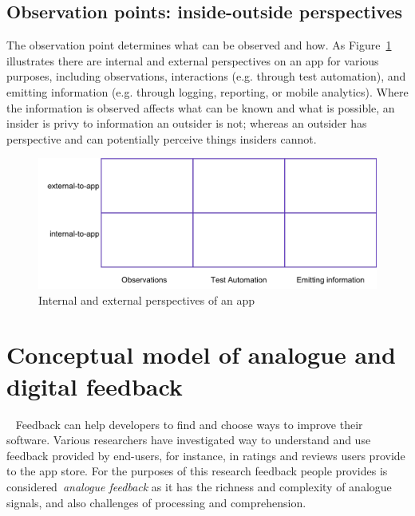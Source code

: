 \subsection{Observation points: inside-outside perspectives}
The observation point determines what can be observed and how. 
As Figure~\ref{fig:internal-external-table} illustrates there are internal and external perspectives on an app for various purposes, including observations, interactions (e.g. through test automation), and emitting information (e.g. through logging, reporting, or mobile analytics). Where the information is observed affects what can be known and what is possible, an insider is privy to information an outsider is not; whereas an outsider has perspective and can potentially perceive things insiders cannot.


\begin{figure}
    \includegraphics[width=\linewidth]{images/internal-external-table.pdf}
    \caption{Internal and external perspectives of an app}
    \label{fig:internal-external-table}
\end{figure}



\section{Conceptual model of analogue and digital feedback}~\label{analogue-and-digital-feedback}
Feedback can help developers to find and choose ways to improve their software. Various researchers have investigated way to understand and use feedback provided by end-users, for instance, in ratings and reviews users provide to the app store. For the purposes of this research feedback people provides is considered~\emph{analogue feedback} as it has the richness and complexity of analogue signals, and also challenges of processing and comprehension.

